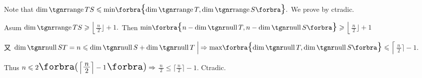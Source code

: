Note that $\dim\range TS\leqslant\min\!\envFontLarge\Bra{\!\dim\range T,\dim\range S}.$ We prove by ctradic.\par\vspace{1pt}\quad
Asum $\dim\range TS\geqslant \Big\lfloor${\Large$\frac{\,n\,}{2}$}$\Big\rfloor+1.$ \,Then $\min\!\envFontLarge\Bra{n-\dim\null T,n-\dim\null S}\envFontDefault\geqslant \Big\lfloor${\Large$\frac{\,n\,}{2}$}$\Big\rfloor+1$\vspace{1pt}\par\quad
又 $\dim\null ST=n\leqslant\dim\null S+\dim\null T\;\Big|\hspace{-0.7pt}\Rightarrow\max\!\envFontLarge\Bra{\!\dim\null T,\dim\null S}\envFontDefault\leqslant \Big\lceil${\Large$\frac{\,n\,}{2}$}$\Big\rceil-1.$\par\vspace{1pt}\quad
Thus \;$n\leqslant 2\envFontLarge\BigPar{\envFontDefault \Big\lceil${\Large$\frac{\,n\,}{2}$}$\Big\rceil-1\envFontLarge}\envFontDefault\Rightarrow{}${\Large$\frac{\,n\,}{2}$}${}\leqslant\Big\lceil${\Large$\frac{\,n\,}{2}$}$\Big\rceil-1$. \;Ctradic.\PfEnd\vspace{4pt}\quad
